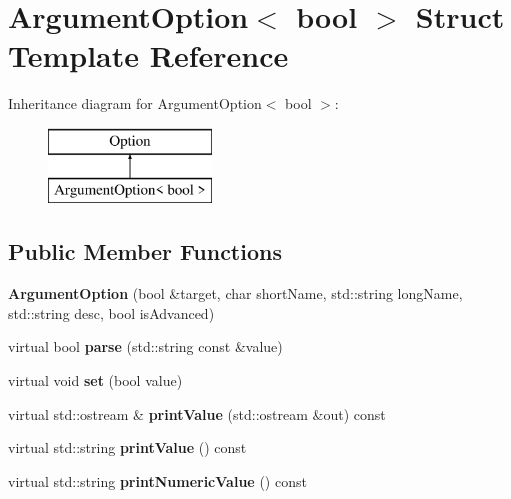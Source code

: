 \hypertarget{structArgumentOption_3_01bool_01_4}{}\section{Argument\+Option$<$ bool $>$ Struct Template Reference}
\label{structArgumentOption_3_01bool_01_4}
Inheritance diagram for Argument\+Option$<$ bool $>$\+:\begin{figure}[H]
\begin{center}
\leavevmode
\includegraphics[height=2.000000cm]{structArgumentOption_3_01bool_01_4}
\end{center}
\end{figure}
\subsection*{Public Member Functions}
\begin{DoxyCompactItemize}
\item 
\mbox{\label{structArgumentOption_3_01bool_01_4_ac5d96035c3e848cb30c486e97d69cdf6}} 
{\bfseries Argument\+Option} (bool \&target, char short\+Name, std\+::string long\+Name, std\+::string desc, bool is\+Advanced)
\item 
\mbox{\label{structArgumentOption_3_01bool_01_4_a641923c93735c0be2fa8500b0bae7ac8}} 
virtual bool {\bfseries parse} (std\+::string const \&value)
\item 
\mbox{\label{structArgumentOption_3_01bool_01_4_ad2b3755a13d9b61e3e38ce329aab0a40}} 
virtual void {\bfseries set} (bool value)
\item 
\mbox{\label{structArgumentOption_3_01bool_01_4_a87f92121777d2b3fb08f16e6d6322aca}} 
virtual std\+::ostream \& {\bfseries print\+Value} (std\+::ostream \&out) const
\item 
\mbox{\label{structArgumentOption_3_01bool_01_4_aa8404a9c61459572556ec4c7540feb05}} 
virtual std\+::string {\bfseries print\+Value} () const
\item 
\mbox{\label{structArgumentOption_3_01bool_01_4_ae26d33edc5943831c3fe6f20949fe180}} 
virtual std\+::string {\bfseries print\+Numeric\+Value} () const
\end{DoxyCompactItemize}
